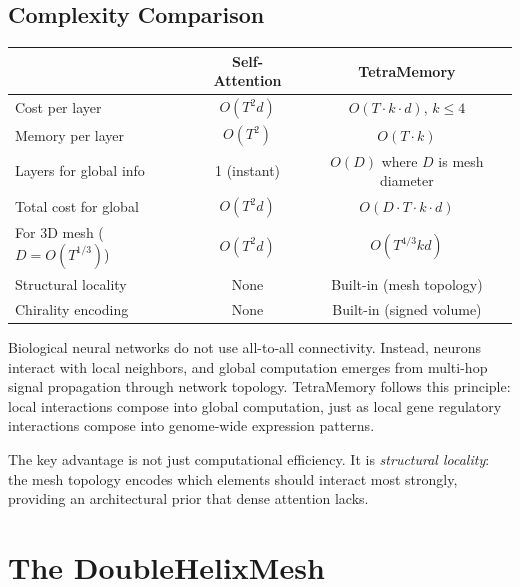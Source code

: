\subsection{Complexity Comparison}

\begin{center}
\renewcommand{\arraystretch}{1.25}
\begin{tabular}{lcc}
\toprule
& \textbf{Self-Attention} & \textbf{TetraMemory} \\
\midrule
Cost per layer & $O(T^2 d)$ & $O(T \cdot k \cdot d)$, $k \leq 4$ \\
Memory per layer & $O(T^2)$ & $O(T \cdot k)$ \\
Layers for global info & 1 (instant) & $O(D)$ where $D$ is mesh diameter \\
Total cost for global & $O(T^2 d)$ & $O(D \cdot T \cdot k \cdot d)$ \\
For 3D mesh ($D = O(T^{1/3})$) & $O(T^2 d)$ & $O(T^{4/3} k d)$ \\
Structural locality & None & Built-in (mesh topology) \\
Chirality encoding & None & Built-in (signed volume) \\
\bottomrule
\end{tabular}
\end{center}

\begin{keyinsight}
Biological neural networks do not use all-to-all connectivity. Instead, neurons
interact with local neighbors, and global computation emerges from multi-hop
signal propagation through network topology. TetraMemory follows this principle:
local interactions compose into global computation, just as local gene
regulatory interactions compose into genome-wide expression patterns.

The key advantage is not just computational efficiency. It is \emph{structural
locality}: the mesh topology encodes which elements should interact most
strongly, providing an architectural prior that dense attention lacks.
\end{keyinsight}

\section{The DoubleHelixMesh}
\label{sec:double-helix-mesh}

